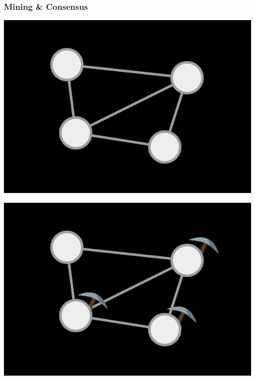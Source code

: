 \documentclass[xcolor=x11names,compress]{beamer}
\begin{document}
\begin{frame}
\end{frame}

\begin{frame}
	\frametitle{Mining \& Consensus}

	\begin{overprint}
		\begin{center}
			\includegraphics[width=\textwidth,height=0.8\textheight,keepaspectratio]{img/mining/01.pdf}
		\end{center}
		\begin{center}
			\includegraphics[width=\textwidth,height=0.8\textheight,keepaspectratio]{img/mining/02.pdf}
		\end{center}
		\begin{center}

\end{center}
\end{overprint}
\end{frame}
\end{document}
